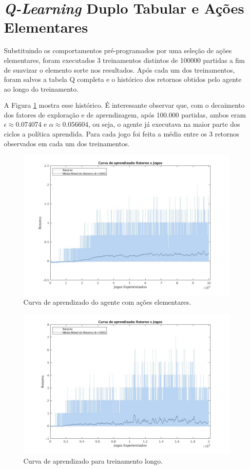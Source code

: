 \section{\textit{Q-Learning} Duplo Tabular e Ações Elementares}

Substituindo os comportamentos pré-programados por uma seleção de ações elementares, foram executados 3 treinamentos distintos de 100000 partidas a fim de suavizar o elemento sorte nos resultados. Após cada um dos treinamentos, foram salvos a tabela Q completa e o histórico dos retornos obtidos pelo agente ao longo do treinamento.

A Figura \ref{fig:single-agent-curva} mostra esse histórico. É interessante observar que, com o decaimento dos fatores de exploração e de aprendizagem, após 100.000 partidas, ambos eram $\epsilon \approx 0.074074$ e $\alpha \approx 0.056604$, ou seja, o agente já executava na maior parte dos ciclos a política aprendida. Para cada jogo foi feita a média entre os 3 retornos observados em cada um dos treinamentos.

\begin{figure}[H]
	\includegraphics[width=0.93\linewidth]{figs/curva-qtabular.jpg}
	\centering
	\caption{Curva de aprendizado do agente com ações elementares. }
	\label{fig:single-agent-curva}
\end{figure}

\begin{figure}[H]
	\includegraphics[width=0.93\linewidth]{figs/curvalonga-qtabular.jpg}
	\centering
	\caption{Curva de aprendizado para treinamento longo.}
	\label{fig:single-agent-curvalonga}
\end{figure}

